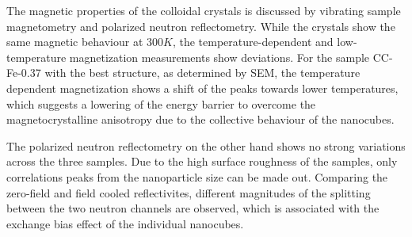 \documentclass[\main/dresen_thesis.tex]{subfiles}
\begin{document}
  The magnetic properties of the colloidal crystals is discussed by vibrating sample magnetometry and polarized neutron reflectometry.
  While the crystals show the same magnetic behaviour at $300 \unit{K}$, the temperature-dependent and low-temperature magnetization measurements show deviations.
  For the sample CC-Fe-0.37 with the best structure, as determined by SEM, the temperature dependent magnetization shows a shift of the peaks towards lower temperatures, which suggests a lowering of the energy barrier to overcome the magnetocrystalline anisotropy due to the collective behaviour of the nanocubes.

  The polarized neutron reflectometry on the other hand shows no strong variations across the three samples.
  Due to the high surface roughness of the samples, only correlations peaks from the nanoparticle size can be made out.
  Comparing the zero-field and field cooled reflectivites, different magnitudes of the splitting between the two neutron channels are observed, which is associated with the exchange bias effect of the individual nanocubes.
\end{document}
